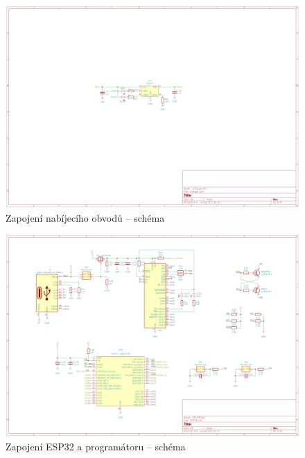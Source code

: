 \begin{figure}
    \centering
    \includegraphics[width=0.93\textheight, angle=90]{kapitoly/ctvrta_elektronicka_varianta/E4_zapojeni/nabijecka.pdf}
    \caption{Zapojení nabíjecího obvodů -- schéma}
    \label{fig:E4-sch_nabijecka}
\end{figure}
\begin{figure}[htbp]
    \centering
    \includegraphics[width=0.93\textheight, angle=90]{kapitoly/ctvrta_elektronicka_varianta/E4_zapojeni/ESP32.pdf}
    \caption{Zapojení ESP32 a programátoru -- schéma}
    \label{fig:E4-sch_ESP32}
\end{figure}
